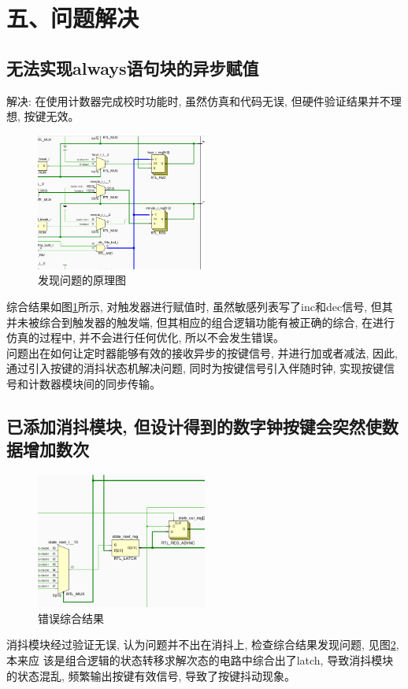 \documentclass{article}
\newcommand{\fourhao}{\fontsize{14pt}{\baselineskip}\selectfont} %
\newcommand{\xiaosihao}{\fontsize{12pt}{\baselineskip}\selectfont} %
\begin{document}
\section*{\fourhao 五、问题解决}
\xiaosihao
{}
\subsection*{无法实现always语句块的异步赋值}
解决: 在使用计数器完成校时功能时, 虽然仿真和代码无误, 但硬件验证结果并不理想, 按键无效。\\
\begin{figure}[H]
    \centering
    \includegraphics[width=0.5\textwidth]{image/2024-06-24-19-51-58.png}
    \caption{发现问题的原理图}
    \label{image_QA_1}
\end{figure}
综合结果如图\ref{image_QA_1}所示, 对触发器进行赋值时, 虽然敏感列表写了inc和dec信号, 但其并未被综合到触发器的触发端, 
但其相应的组合逻辑功能有被正确的综合, 在进行仿真的过程中, 并不会进行任何优化, 所以不会发生错误。\\

问题出在如何让定时器能够有效的接收异步的按键信号, 并进行加或者减法, 因此, 通过引入按键的消抖状态机解决问题, 
同时为按键信号引入伴随时钟, 实现按键信号和计数器模块间的同步传输。
\subsection*{已添加消抖模块, 但设计得到的数字钟按键会突然使数据增加数次}
\begin{figure}[htbp]
    \centering
    \includegraphics[width=0.5\textwidth]{image/2024-06-24-22-21-16.png}
    \caption{错误综合结果}
    \label{image_QA_2}
\end{figure}
消抖模块经过验证无误, 认为问题并不出在消抖上, 检查综合结果发现问题, 见图\ref{image_QA_2}, 本来应
该是组合逻辑的状态转移求解次态的电路中综合出了latch, 导致消抖模块的状态混乱, 频繁输出按键有效信号, 
导致了按键抖动现象。\\
\end{document}
